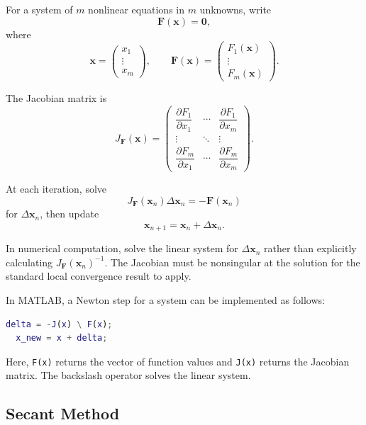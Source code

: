 For a system of \(m\) nonlinear equations in \(m\) unknowns, write
\[
  \mathbf{F}(\mathbf{x})=\mathbf{0},
\]
where
\[
  \mathbf{x}=
  \begin{pmatrix}
    x_1\\\vdots\\x_m
  \end{pmatrix},
  \qquad
  \mathbf{F}(\mathbf{x})=
  \begin{pmatrix}
    F_1(\mathbf{x})\\\vdots\\F_m(\mathbf{x})
  \end{pmatrix}.
\]

The Jacobian matrix is
\[
  J_{\mathbf{F}}(\mathbf{x})=
  \begin{pmatrix}
    \dfrac{\partial F_1}{\partial x_1} & \cdots &
    \dfrac{\partial F_1}{\partial x_m}\\
    \vdots & \ddots & \vdots\\
    \dfrac{\partial F_m}{\partial x_1} & \cdots &
    \dfrac{\partial F_m}{\partial x_m}
  \end{pmatrix}.
\]

\begin{definition}
  At each iteration, solve
  \[
    J_{\mathbf{F}}(\mathbf{x}_n)\Delta\mathbf{x}_n
    =-\mathbf{F}(\mathbf{x}_n)
  \]
  for \(\Delta\mathbf{x}_n\), then update
  \[
    \boxed{
      \mathbf{x}_{n+1}=\mathbf{x}_n+\Delta\mathbf{x}_n.
    }
  \]
\end{definition}

\begin{remark}
  In numerical computation, solve the linear system for \(\Delta\mathbf{x}_n\) rather than explicitly calculating \(J_{\mathbf{F}}(\mathbf{x}_n)^{-1}\). The Jacobian must be nonsingular at the solution for the standard local convergence result to apply.
\end{remark}

\begin{example}
  In MATLAB, a Newton step for a system can be implemented as follows:
  \begin{lstlisting}[language=Matlab]
  delta = -J(x) \ F(x);
  x_new = x + delta;
  \end{lstlisting}
  Here, \texttt{F(x)} returns the vector of function values and \texttt{J(x)} returns the Jacobian matrix. The backslash operator solves the linear system.
\end{example}

\subsection{Secant Method}

